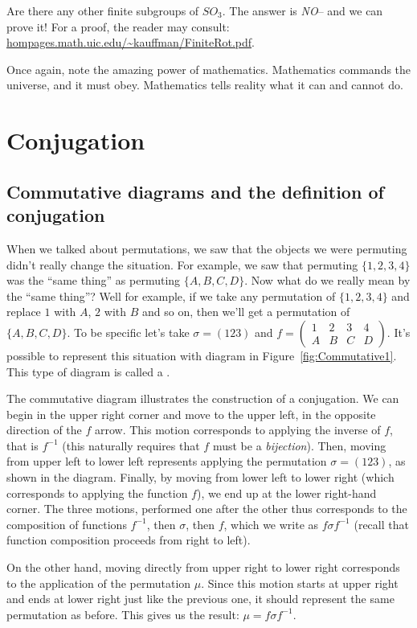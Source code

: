 Are there any other finite subgroups of $SO_3$.  The answer is \emph{NO}-- and we can prove it! For a proof, the reader may consult: \url{hompages.math.uic.edu/~kauffman/FiniteRot.pdf}.

Once again, note the amazing power of mathematics. Mathematics commands the universe, and it must obey. Mathematics tells reality what it can and cannot do.


\section{Conjugation}\label{Conjugation}
\subsection{Commutative diagrams and the definition of conjugation}
When we talked about permutations, we saw that the objects we were permuting didn't really change the situation.  For example, we saw that permuting $\{1,2,3,4\}$ was the ``same thing'' as permuting $\{A,B,C,D\}$. Now what do we really mean by the ``same thing''? Well for example, if we take any permutation of $\{1,2,3,4\}$ and replace $1$ with $A$, $2$ with $B$ and so on, then we'll get a permutation of $\{A,B,C,D\}$. To be specific let's take $\sigma=(123)$ and $f=\begin{pmatrix} 1&2&3&4\\A&B&C&D\end {pmatrix}$.  It's possible to represent this situation with diagram in Figure~\ref{fig:Commutative1}. This type of diagram is called a .


The commutative diagram illustrates the construction of a conjugation. We can begin in the upper right corner and move to the upper left, in the opposite direction of the $f$ arrow. This motion corresponds to
applying the inverse of $f$, that is 
 $f^{-1}$ (this naturally requires that $f$ must be a \emph{bijection}).  Then, moving from upper left to lower left represents applying the permutation $\sigma=(123)$, as shown in the diagram.  Finally, by moving from lower left to lower right (which corresponds to 
applying the function $f$), we end up at the lower right-hand corner. The three motions, performed one after the other thus corresponds to the composition of functions $f^{-1}$, then $\sigma$, then $f$, which we write as
$f \sigma f^{-1}$ (recall that function composition proceeds from right to left). 

On the other hand, moving directly from upper right to lower right corresponds to the application of 
the permutation $\mu$. Since this motion starts at upper right and ends at lower right just like the previous
one, it should represent the same permutation as before. This gives us the result:
 $\mu=f\sigma f^{-1}$.    

